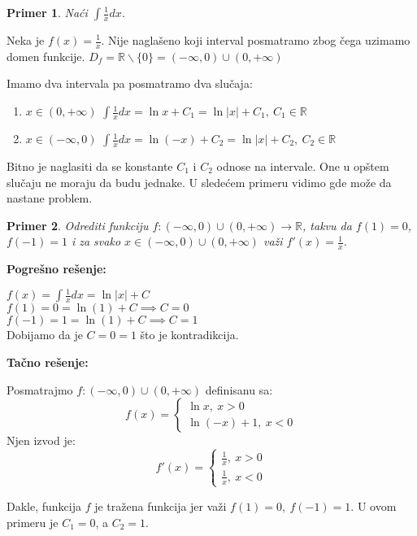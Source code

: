 \documentclass{article}
\newtheorem{prim}{Primer}[section]
\begin{document}
\begin{primbox}
    \begin{prim}
        Naći $\int\frac{1}{x}dx$.
    \end{prim}
    Neka je $f(x) = \frac{1}{x}$.
    Nije naglašeno koji interval posmatramo zbog čega uzimamo domen
    funkcije.
    $D_f= \mathbb{R}\backslash \{0\} =
        (-\infty, 0)\cup(0, +\infty)$\par
    Imamo dva intervala pa posmatramo dva slučaja:
    \begin{enumerate}[leftmargin=2cm, label=\arabic*. slučaj:]
        \item $x \in (0, +\infty)$ $\int \frac{1}{x}dx =
                  \ln x + C_1=\ln|x| + C_1,\ C_1\in\mathbb{R}$
        \item $x \in (-\infty, 0)$ $\int \frac{1}{x}dx =
                  \ln(-x) + C_2=\ln|x| + C_2,\ C_2\in\mathbb{R}$
    \end{enumerate}
\end{primbox}
Bitno je naglasiti da se konstante $C_1$ i $C_2$ odnose na intervale. One
u opštem slučaju ne moraju da budu jednake.
U sledećem primeru vidimo gde može da nastane problem.

\begin{primbox}
    \begin{prim}
        Odrediti funkciju $f: (-\infty, 0)\cup(0, +\infty)
            \longrightarrow \mathbb{R}$, takvu da $f(1) = 0$,
        $f(-1) = 1$ i za svako $x \in (-\infty, 0)
            \cup(0, +\infty)$ važi
        $f'(x) = \frac{1}{x}$.
    \end{prim}
    \textbf{Pogrešno rešenje:}\par
    $f(x) = \int \frac{1}{x}dx = \ln|x| + C$\\
    $f(1) = 0 = \ln(1) + C \implies C = 0$\\
    $f(-1) = 1 = \ln(1) + C \implies C = 1$\\
    Dobijamo da je $C=0=1$ što je kontradikcija.\par
    \textbf{Tačno rešenje:}\par
    Posmatrajmo $f: (-\infty, 0)\cup(0, +\infty)$
    definisanu sa:
    $$
        f(x) =
        \begin{cases}
            \ln x,\ x > 0 \\
            \ln (-x) + 1,\ x < 0
        \end{cases}
    $$
    Njen izvod je:
    $$f'(x) =
        \begin{cases}
            \frac{1}{x},\ x > 0 \\
            \frac{1}{x},\ x < 0
        \end{cases}$$

    Dakle, funkcija $f$ je tražena funkcija jer važi
    $f(1) = 0,\ f(-1) = 1$. U ovom primeru je $C_1=0$, a $C_2=1$.
\end{primbox}
\end{document}

